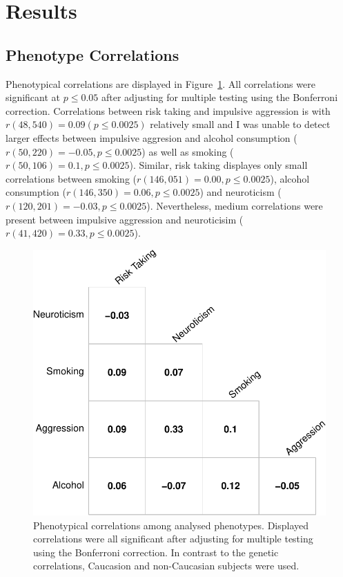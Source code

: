\section{Results}
\label{sec:results_ukb_assoc}

\subsection{Phenotype Correlations}
\label{sub:phenotype_correlations}

Phenotypical correlations are displayed in Figure~\ref{fig:corr_pheno}. 
All correlations were significant at $p\leq 0.05$ after adjusting for multiple testing using the Bonferroni correction.
Correlations between risk taking and impulsive aggression is with $r(48,540)=0.09 (p\leq0.0025)$ relatively small
and I was unable to detect larger effects between impulsive aggresion and alcohol consumption ($r(50,220)=-0.05, p\leq0.0025$)
as well as smoking ($r(50,106)=0.1, p\leq0.0025$).
Similar, risk taking displayes only small correlations between
smoking ($r(146,051)=0.00, p\leq0.0025$),
alcohol consumption ($r(146,350)=0.06, p\leq0.0025$)
and neuroticism ($r(120,201)=-0.03, p\leq0.0025$). 
Nevertheless, medium correlations were present between impulsive aggression and neuroticisim ($r(41,420)=0.33, p\leq0.0025$).

\begin{figure}[htpb]
  \centering
  \includegraphics[width=0.6\linewidth]{figure/phenotype/corr_plot_ci.pdf} 
  \caption{
    Phenotypical correlations among analysed phenotypes.
    Displayed correlations were all significant after adjusting for multiple testing using the Bonferroni correction.
    In contrast to the genetic correlations, Caucasion and non-Caucasian subjects were used.
  }\label{fig:corr_pheno}
\end{figure}

